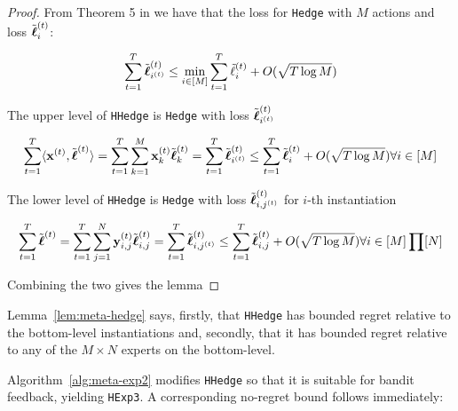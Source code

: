\begin{proof}
 
 From Theorem 5 in \citep{freund1997decision} we have that the loss for \texttt{Hedge}  with $M$ actions and loss $\tilde{\boldsymbol\ell}^{(t)}_i$:

\begin{equation}
 \sum_{t=1}^T \tilde{\boldsymbol\ell}^{(t)}_{i^{(t)}} 
 \leq \min_{i\in[M]} \sum_{t=1}^T \tilde{\ell}^{(t)}_i + O(\sqrt{T \log M})
 \end{equation}
 
 The upper level of  \texttt{HHedge} is \texttt{Hedge} with loss $\tilde{\boldsymbol\ell}^{(t)}_{i^{(t)}} $
 
 \begin{equation}
  \sum_{t=1}^T \langle {\mathbf x}^{(t)},\tilde{\boldsymbol\ell}^{(t)}\rangle 
  = \sum_{t=1}^T \sum_{k=1}^M {\mathbf x}^{(t)}_k  \tilde{\boldsymbol\ell}^{(t)}_k
  =   \sum_{t=1}^T \tilde{\boldsymbol\ell}^{(t)}_{i^{(t)}} 
  \leq \sum_{t=1}^T \tilde{\boldsymbol\ell}^{(t)}_{i} +  O(\sqrt{T \log M}) \forall i\in[M] 
 \end{equation}
 
 The lower level of  \texttt{HHedge} is \texttt{Hedge} with loss  $\tilde{\boldsymbol\ell}^{(t)}_{i,j^{(t)}} $ for $i$-th instantiation
 
 
 \begin{equation}
 \sum_{t=1}^T \tilde{\boldsymbol\ell}^{(t)}
 = \sum_{t=1}^T \sum_{j=1}^N {\mathbf y}^{(t)}_{i,j}  \tilde{\boldsymbol\ell}^{(t)}_{i,j}
 =   \sum_{t=1}^T \tilde{\boldsymbol\ell}^{(t)}_{{i,j}^{(t)}} 
 \leq \sum_{t=1}^T \tilde{\boldsymbol\ell}^{(t)}_{i,j} +  O(\sqrt{T \log M}) \forall i\in[M]\prod[N] 
 \end{equation}
 
Combining the two gives the lemma
\end{proof}

Lemma~\ref{lem:meta-hedge} says, firstly, that \texttt{HHedge} has bounded regret relative to the bottom-level instantiations and, secondly, that it has bounded regret relative to any of the $M\times N$ experts on the bottom-level.

Algorithm~\ref{alg:meta-exp2} modifies \texttt{HHedge} so that it is suitable for bandit feedback, yielding \texttt{HExp3}. A corresponding no-regret bound follows immediately:

